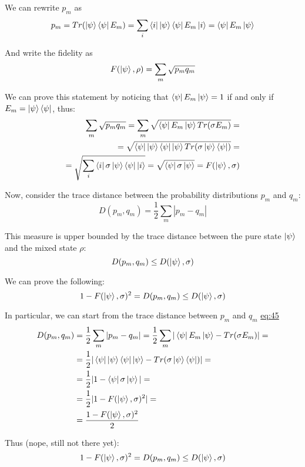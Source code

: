 \documentclass{masterthesis}
\begin{document}
We can rewrite $p_m$ as
\begin{equation}
    p_m = Tr(\ket{\psi}\bra{\psi} E_m) = \sum_{i} \bra{i} \ket{\psi}\bra{\psi} E_m \ket{i} = \bra{\psi}E_m\ket{\psi}
\end{equation}

And write the fidelity as
\begin{equation}
    F(\ket{\psi}, \rho) = \sum_{m} \sqrt{p_m q_m} 
\end{equation}

We can prove this statement by noticing that $\bra{\psi}E_m\ket{\psi} = 1$ if and only if $E_m = \ket{\psi}\bra{\psi}$, thus:
\begin{align}
    \sum_{m} \sqrt{p_m q_m} = \sum_{m} \sqrt{\bra{\psi}E_m\ket{\psi} Tr(\sigma E_m)} = \\
    = \sqrt{\bra{\psi}\ket{\psi}\bra{\psi}\ket{\psi} Tr(\sigma \ket{\psi}\bra{\psi})} = \\
    = \sqrt{\sum_{i} \bra{i} \sigma \ket{\psi}\bra{\psi} \ket{i}} = \sqrt{\bra{\psi} \sigma \ket{\psi}} = F(\ket{\psi}, \sigma)
\end{align}

Now, consider the trace distance between the probability distributions $p_m$ and $q_m$:
\begin{equation}\label{eq:trace-dist}
    D(p_m, q_m) = \frac{1}{2} \sum_{m} |p_m - q_m|
\end{equation}

This measure is upper bounded by the trace distance between the pure state $\ket{\psi}$ and the mixed state $\rho$:
\begin{equation}
    D(p_m, q_m) \leq D(\ket{\psi}, \sigma)
\end{equation}


We can prove the following:
\begin{equation}
    1 - F(\ket{\psi}, \sigma)^2 = D(p_m, q_m) \leq D(\ket{\psi}, \sigma)
\end{equation}

In particular, we can start from the trace distance between $p_m$ and $q_m$ \hyperref[eq:trace-dist]{eq:45}
\begin{align}
    D(p_m, q_m) &= \frac{1}{2} \sum_{m} |p_m - q_m| = \frac{1}{2} \sum_{m} |\bra{\psi}E_m\ket{\psi} - Tr(\sigma E_m)| = \\
    &= \frac{1}{2} |\bra{\psi}\ket{\psi}\bra{\psi}\ket{\psi} - Tr(\sigma \ket{\psi}\bra{\psi})| = \\
    &= \frac{1}{2} |1 - \bra{\psi} \sigma \ket{\psi}| = \\ 
    &= \frac{1}{2} |1 - F(\ket{\psi}, \sigma)^2| = \\
    &= \frac{1 - F(\ket{\psi}, \sigma)^2}{2}
\end{align}

Thus (nope, still not there yet):
\begin{equation}
    1 - F(\ket{\psi}, \sigma)^2 = D(p_m, q_m) \leq D(\ket{\psi}, \sigma)
\end{equation}
\end{document}
